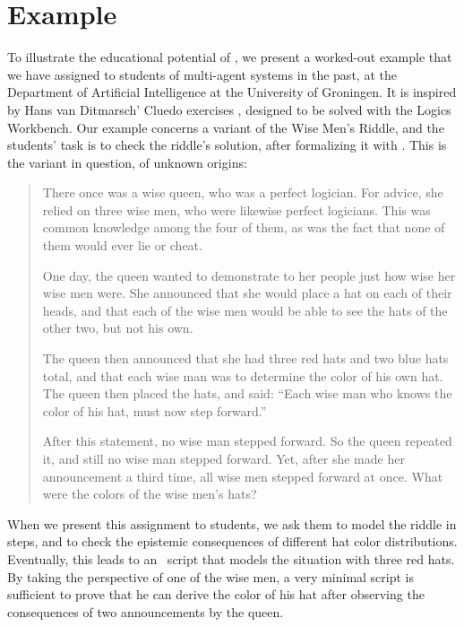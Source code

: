 \section{Example}
\label{sec:example}

To illustrate the educational potential of \oops\/, we present a worked-out example that we have assigned to students of multi-agent systems in the past, at the Department of Artificial Intelligence at the University of Groningen.  It is inspired by Hans van Ditmarsch' Cluedo exercises \citep{lwbcluedo}, designed to be  solved with the Logics Workbench. Our example concerns a variant of the Wise Men's Riddle, and the students' task is to check the riddle's solution, after formalizing it with \oops\/. This is the variant in question, of unknown origins:

\begin{quote}

There once was a wise queen, who was a perfect logician. For advice, she relied on three wise men, who were likewise perfect logicians. This was common knowledge among the four of them, as was the fact that none of them would ever lie or cheat.

One day, the queen wanted to demonstrate to her people just how wise her wise men were. She announced that she would place a hat on each of their heads, and that each of the wise men would be able to see the hats of the other two, but not his own.

The queen then announced that she had three red hats and two blue hats total, and that each wise man was to determine the color of his own hat. The queen then placed the hats, and said: \textquotedblleft Each wise man who knows the color of his hat, must now step forward.\textquotedblright

After this statement, no wise man stepped forward. So the queen repeated it, and still no wise man stepped forward. Yet, after she made her announcement a third time, all wise men stepped forward at once. What were the colors of the wise men's hats?

\end{quote}

When we present this assignment to students, we ask them to model the riddle in steps, and to check the epistemic consequences of different hat color distributions. Eventually, this leads to an \oops\  script that models the situation with three red hats. By taking the perspective of one of the wise men, a very minimal script is sufficient to prove that he can derive the color of his hat after observing the consequences of two announcements by the queen.

